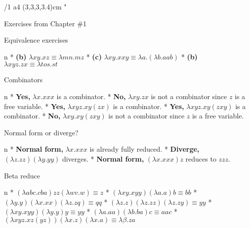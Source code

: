 



\margins/1 a4 (3,3,3,3.4)cm
\typosize[9/10.5]
\parindent=10pt
\hyperlinks \Blue\Blue
\activettchar"
\def\intthook{\localcolor\Red}

\tit Exercises from Chapter \#1

\sec Equivalence exercises

\begitems \style n
* {\bf (b)} $\lambda xy.xz \equiv \lambda mn.mz$ 
* {\bf (c)} $\lambda xy.xxy \equiv \lambda a.(\lambda b.aab)$
* {\bf (b)} $\lambda xyz.zx \equiv \lambda tos.st$
\enditems

\sec Combinators

\begitems \style n
* {\bf Yes,} $\lambda x.xxx$ is a combinator.
* {\bf No,} $\lambda xy.zx$ is not a combinator since $z$ is a free variable.
* {\bf Yes,} $\lambda xyz.xy(zx)$ is a combinator.
* {\bf Yes,} $\lambda xyz.xy(zxy)$ is a combinator.
* {\bf No,} $\lambda xy.xy(zxy)$ is not a combinator since $z$ is a free variable.
\enditems

\sec Normal form or diverge?

\begitems \style n
* {\bf Normal form,} $\lambda x.xxx$ is already fully reduced.
* {\bf Diverge,} $(\lambda z.zz)(\lambda y.yy)$ diverges.
* {\bf Normal form,} $(\lambda x.xxx)z$ reduces to $zzz$.
\enditems

\sec Beta reduce

\begitems \style n
* $(\lambda abc.cba)zz(\lambda wv.w) \equiv z$
* $(\lambda xy.xyy)(\lambda a.a)b \equiv bb$
* $(\lambda y.y)(\lambda x.xx)(\lambda z.zq) \equiv qq$
* $(\lambda z.z)(\lambda z.zz)(\lambda z.zy) \equiv yy$
* $(\lambda xy.xyy)(\lambda y.y)y \equiv yy$
* $(\lambda a.aa)(\lambda b.ba)c \equiv aac$
* $(\lambda xyz.xz(yz))(\lambda x.z)(\lambda x.a) \equiv \lambda \beta.za$
\enditems

\bye
